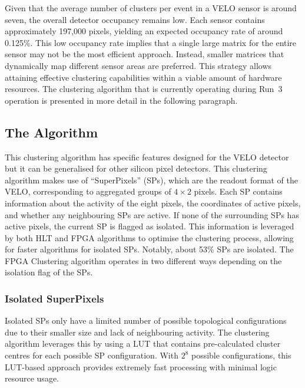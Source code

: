 Given that the average number of clusters per event in a VELO sensor is around seven, the overall detector occupancy remains low. Each sensor contains approximately 197,000 pixels, yielding an expected occupancy rate of around 0.125\%\cite{Bediaga:2013tje}. This low occupancy rate implies that a single large matrix for the entire sensor may not be the most efficient approach. Instead, smaller matrices that dynamically map different sensor areas are preferred. This strategy allows attaining effective clustering capabilities within a viable amount of hardware resources.
The clustering algorithm that is currently operating during Run~3 operation is presented in more detail in the following paragraph.

\subsection*{The Algorithm}
This clustering algorithm has specific features designed for the VELO detector but it can be generalised for other silicon pixel detectors. This clustering algorithm makes use of ``SuperPixels'' (SPs), which are the readout format of the VELO, corresponding to aggregated groups of $4\times 2$ pixels. Each SP contains information about the activity of the eight pixels, the coordinates of active pixels, and whether any neighbouring SPs are active. If none of the surrounding SPs has active pixels, the current SP is flagged as isolated. This information is leveraged by both HLT and FPGA algorithms to optimise the clustering process, allowing for faster algorithms for isolated SPs. Notably, about 53\% SPs are isolated.
The FPGA Clustering algorithm operates in two different ways depending on the isolation flag of the SPs.
\subsubsection{Isolated SuperPixels}
Isolated SPs only have a limited number of possible topological configurations due to their smaller size and lack of neighbouring activity. The clustering algorithm leverages this by using a LUT that contains pre-calculated cluster centres for each possible SP configuration. With $2^8$ possible configurations, this LUT-based approach provides extremely fast processing with minimal logic resource usage.

